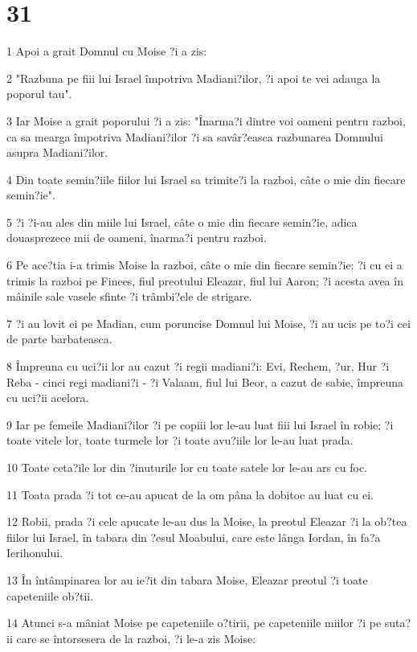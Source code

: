 \chapter{31}

\par 1 Apoi a grait Domnul cu Moise ?i a zis:
\par 2 "Razbuna pe fiii lui Israel împotriva Madiani?ilor, ?i apoi te vei adauga la poporul tau".
\par 3 Iar Moise a grait poporului ?i a zis: "Înarma?i dintre voi oameni pentru razboi, ca sa mearga împotriva Madiani?ilor ?i sa savâr?easca razbunarea Domnului asupra Madiani?ilor.
\par 4 Din toate semin?iile fiilor lui Israel sa trimite?i la razboi, câte o mie din fiecare semin?ie".
\par 5 ?i ?i-au ales din miile lui Israel, câte o mie din fiecare semin?ie, adica douasprezece mii de oameni, înarma?i pentru razboi.
\par 6 Pe ace?tia i-a trimis Moise la razboi, câte o mie din fiecare semin?ie; ?i cu ei a trimis la razboi pe Finees, fiul preotului Eleazar, fiul lui Aaron; ?i acesta avea în mâinile sale vasele sfinte ?i trâmbi?ele de strigare.
\par 7 ?i au lovit ei pe Madian, cum poruncise Domnul lui Moise, ?i au ucis pe to?i cei de parte barbateasca.
\par 8 Împreuna cu uci?ii lor au cazut ?i regii madiani?i: Evi, Rechem, ?ur, Hur ?i Reba - cinci regi madiani?i - ?i Valaam, fiul lui Beor, a cazut de sabie, împreuna cu uci?ii acelora.
\par 9 Iar pe femeile Madiani?ilor ?i pe copiii lor le-au luat fiii lui Israel în robie; ?i toate vitele lor, toate turmele lor ?i toate avu?iile lor le-au luat prada.
\par 10 Toate ceta?ile lor din ?inuturile lor cu toate satele lor le-au ars cu foc.
\par 11 Toata prada ?i tot ce-au apucat de la om pâna la dobitoc au luat cu ei.
\par 12 Robii, prada ?i cele apucate le-au dus la Moise, la preotul Eleazar ?i la ob?tea fiilor lui Israel, în tabara din ?esul Moabului, care este lânga Iordan, în fa?a Ierihonului.
\par 13 În întâmpinarea lor au ie?it din tabara Moise, Eleazar preotul ?i toate capeteniile ob?tii.
\par 14 Atunci s-a mâniat Moise pe capeteniile o?tirii, pe capeteniile miilor ?i pe suta?ii care se întorsesera de la razboi, ?i le-a zis Moise:
